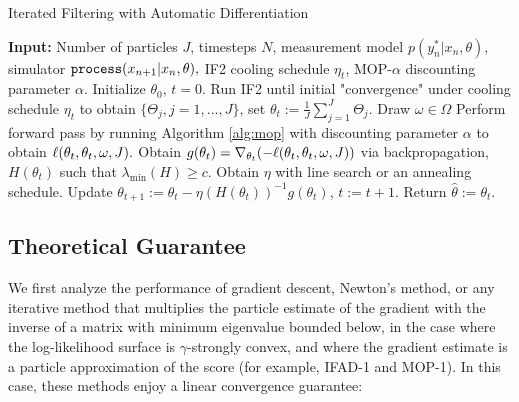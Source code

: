 \documentclass{article}
\begin{document}
\begin{algorithm}[ht]
\centering
	\caption{Iterated Filtering with Automatic Differentiation}
    \label{alg:ifad}
	\begin{algorithmic}[1]
	     \STATE \textbf{Input:} Number of particles $J$, timesteps $N$, measurement model $p(y_n^*|x_n, \theta)$, simulator $\texttt{process}(x_{n+1}|x_n, \theta),$ IF2 cooling schedule $\eta_t$, MOP-$\alpha$ discounting parameter $\alpha$.
		\STATE Initialize $\theta_0$, $t=0.$
        \STATE Run IF2 until initial "convergence" under cooling schedule $\eta_t$ to obtain $\{\Theta_j, j=1,...,J\}$, set $\theta_t := \frac{1}{J}\sum_{j=1}^J \Theta_j.$
		\STATE Draw $\omega \in \Omega$
		\STATE Perform forward pass by running Algorithm \ref{alg:mop} with discounting parameter $\alpha$ to obtain $\ell(\theta_t, \theta_t, \omega, J).$
		\STATE Obtain $g(\theta_t) = \nabla_{\theta_t} (-\ell(\theta_t, \theta_t, \omega, J))$ via backpropagation, $H(\theta_t)$ such that $\lambda_{\min}(H) \geq c$.
		\STATE Obtain $\eta$ with line search or an annealing schedule.
		\STATE Update $\theta_{t+1} := \theta_t - \eta (H(\theta_t))^{-1} g(\theta_t)$, $t:=t+1.$
		\ENDWHILE
		\STATE Return $\hat{\theta} := \theta_t.$
	\end{algorithmic}
\end{algorithm}

\subsection{Theoretical Guarantee}

We first analyze the performance of gradient descent, Newton's method, or any iterative method that multiplies the particle estimate of the gradient with the inverse of a matrix with minimum eigenvalue bounded below, in the case where the log-likelihood surface is $\gamma$-strongly convex, and where the gradient estimate is a particle approximation of the score (for example, IFAD-1 and MOP-1). In this case, these methods enjoy a linear convergence guarantee:

\end{document}
